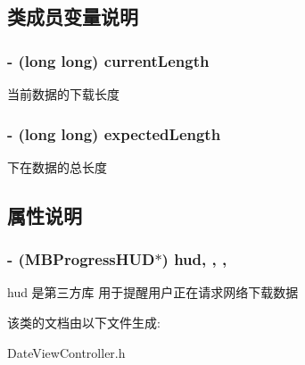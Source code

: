 \subsection{类成员变量说明}
\hypertarget{interface_date_view_controller_a10154a7a8d6c08b5e8149c2678264c7e}{
\subsubsection[{current\-Length}]{\setlength{\rightskip}{0pt plus 5cm}-\/ (long long) current\-Length\hspace{0.3cm}{\ttfamily [protected]}}}\label{interface_date_view_controller_a10154a7a8d6c08b5e8149c2678264c7e}
当前数据的下载长度 \hypertarget{interface_date_view_controller_ac977fba71126dc96513743e8db033743}{
\subsubsection[{expected\-Length}]{\setlength{\rightskip}{0pt plus 5cm}-\/ (long long) expected\-Length\hspace{0.3cm}{\ttfamily [protected]}}}\label{interface_date_view_controller_ac977fba71126dc96513743e8db033743}
下在数据的总长度 

\subsection{属性说明}
\hypertarget{interface_date_view_controller_adb68a544ccdbac21ae0bd3ee08d868f3}{
\subsubsection[{hud}]{\setlength{\rightskip}{0pt plus 5cm}-\/ ({\bf M\-B\-Progress\-H\-U\-D}$\ast$) hud\hspace{0.3cm}{\ttfamily [read]}, {\ttfamily [write]}, {\ttfamily [nonatomic]}, {\ttfamily [retain]}}}\label{interface_date_view_controller_adb68a544ccdbac21ae0bd3ee08d868f3}
hud 是第三方库 用于提醒用户正在请求网络下载数据 

该类的文档由以下文件生成\-:\begin{DoxyCompactItemize}
\item 
Date\-View\-Controller.\-h\end{DoxyCompactItemize}
